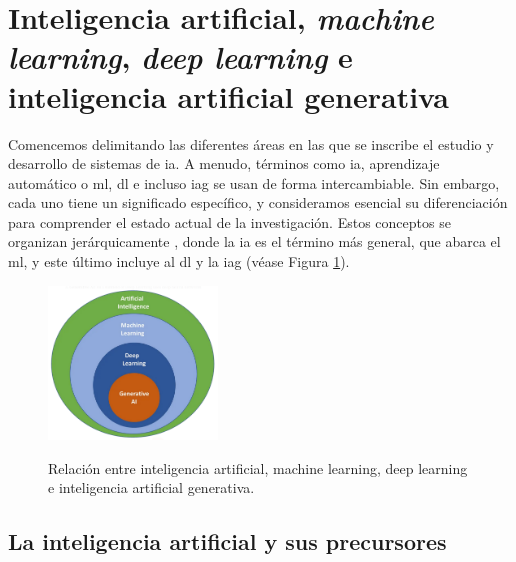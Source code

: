 
\section{Inteligencia artificial, \emph{machine learning}, \emph{deep learning} e inteligencia artificial generativa}

Comencemos delimitando las diferentes áreas en las que se inscribe el estudio y desarrollo de sistemas de \gls{ia}. A menudo, términos como \gls{ia}, aprendizaje automático o \gls{ml}, \gls{dl} e incluso \gls{iag} se usan de forma intercambiable. Sin embargo, cada uno tiene un significado específico, y consideramos esencial su diferenciación para comprender el estado actual de la investigación. Estos conceptos se organizan jerárquicamente \citep{torresivinalsPythonDeepLearning2020}, donde la \gls{ia} es el término más general, que abarca el \gls{ml}, y este último incluye al \gls{dl} y la \gls{iag} (véase Figura \ref{fig:ai_ml_dl_gai}).

\begin{figure}[H]
    \caption[Relación entre inteligencia artificial, {machine learning}, {deep learning} e inteligencia artificial generativa]{Relación entre inteligencia artificial, {machine learning}, {deep learning} e inteligencia artificial generativa.}
    \centering
    \includegraphics[width=0.4\textwidth]{./figuras/ai_ml_dl_gai.png}
    \label{fig:ai_ml_dl_gai}
\end{figure}



\subsection{La inteligencia artificial y sus precursores}

